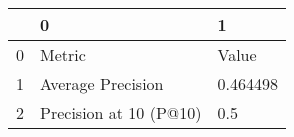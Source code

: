 \begin{tabular}{lll}
\toprule
{} &                       0 &         1 \\
\midrule
0 &                  Metric &     Value \\
1 &       Average Precision &  0.464498 \\
2 &  Precision at 10 (P@10) &       0.5 \\
\bottomrule
\end{tabular}
